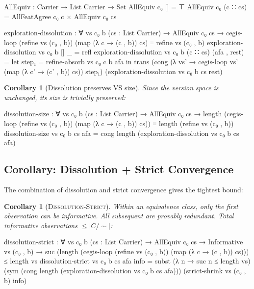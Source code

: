 \documentclass[9pt,a4paper]{article}
\theoremstyle{plain}
\newtheorem{corollary}[theorem]{Corollary}
\theoremstyle{definition}
\theoremstyle{remark}
\begin{document}
\begin{code}
    AllEquiv : Carrier → List Carrier → Set
    AllEquiv c₀ []       = ⊤
    AllEquiv c₀ (c ∷ cs) = AllFeatAgree c₀ c × AllEquiv c₀ cs

    exploration-dissolution : ∀ vs c₀ b (cs : List Carrier) →
      AllEquiv c₀ cs →
      cegis-loop (refine vs (c₀ , b)) (map (λ c → (c , b)) cs)
        ≡ refine vs (c₀ , b)
    exploration-dissolution vs c₀ b [] _ = refl
    exploration-dissolution vs c₀ b (c ∷ cs) (afa , rest) =
      let step₁ = refine-absorb vs c₀ c b afa
      in trans
        (cong (λ vs' → cegis-loop vs' (map (λ c' → (c' , b)) cs))
              step₁)
        (exploration-dissolution vs c₀ b cs rest)
\end{code}

\begin{corollary}[Dissolution preserves VS size]
Since the version space is unchanged, its size is trivially preserved:
\end{corollary}

\begin{code}
    dissolution-size : ∀ vs c₀ b (cs : List Carrier) →
      AllEquiv c₀ cs →
      length (cegis-loop (refine vs (c₀ , b))
                         (map (λ c → (c , b)) cs))
        ≡ length (refine vs (c₀ , b))
    dissolution-size vs c₀ b cs afa =
      cong length (exploration-dissolution vs c₀ b cs afa)
\end{code}

\subsection{Corollary: Dissolution + Strict Convergence}

The combination of dissolution and strict convergence gives the tightest bound:

\begin{corollary}[\textsc{Dissolution-Strict}]
Within an equivalence class, only the \emph{first} observation can be informative.  All subsequent are provably redundant.  Total informative observations $\le |C/{\sim}|$:
\end{corollary}

\begin{code}
    dissolution-strict : ∀ vs c₀ b (cs : List Carrier) →
      AllEquiv c₀ cs →
      Informative vs (c₀ , b) →
      suc (length (cegis-loop (refine vs (c₀ , b))
                               (map (λ c → (c , b)) cs)))
        ≤ length vs
    dissolution-strict vs c₀ b cs afa info =
      subst (λ n → suc n ≤ length vs)
            (sym (cong length (exploration-dissolution vs c₀ b cs afa)))
            (strict-shrink vs (c₀ , b) info)
\end{code}
\end{document}
